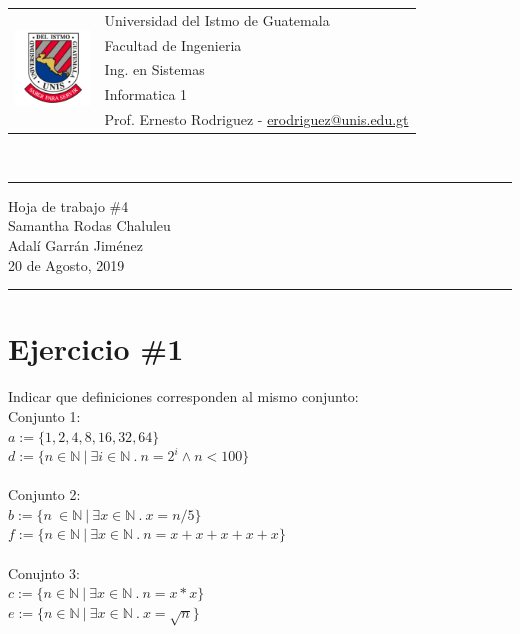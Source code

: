 \documentclass{article}
\newcommand{\horrule}[1]{\rule{\linewidth}{#1}}
\begin{document}
\begin{tabular}{l l}
\multirow{5}{*}{\includegraphics[width=2cm]{escudo.png}} & Universidad del Istmo de Guatemala \\
 & Facultad de Ingenieria \\
 & Ing. en Sistemas \\
 & Informatica 1 \\
 & Prof. Ernesto Rodriguez - \href{mailto:erodriguez@unis.edu.gt}{erodriguez@unis.edu.gt} \\
\end{tabular}
\\

\begin{center}
        \horrule{0.5pt}
        \huge{Hoja de trabajo \#4} \\
        \large{Samantha Rodas Chaluleu}\\
        \large{Adalí Garrán Jiménez}\\
        \large{20 de Agosto, 2019} \\
        \horrule{1pt}
\end{center}

\section*{Ejercicio \#1}
Indicar que definiciones corresponden al mismo conjunto:\\
Conjunto 1:\\
$a:=\{1,2,4,8,16,32,64\}$\\
$d:=\{n\in\mathbb{N}\ |\ \exists i\in\mathbb{N}\ .\ n=2^i\wedge n<100 \}$\\\\
Conjunto 2:\\
$b:=\{n\ \in \mathbb{N}\ |\ \exists x \in \mathbb{N}\ .\ x=n/5 \}$\\
$f:=\{ n\in\mathbb{N}\ |\ \exists x\in \mathbb{N}\ .\ n=x+x+x+x+x \}$\\\\
Conujnto 3:\\
$c:=\{n\in \mathbb{N}\ |\ \exists x\in\mathbb{N}\ .\ n=x*x \}$\\
$e:=\{ n\in\mathbb{N}\ |\ \exists x\in \mathbb{N}\ .\ x=\sqrt{n} \}$\\\\
\end{document}
